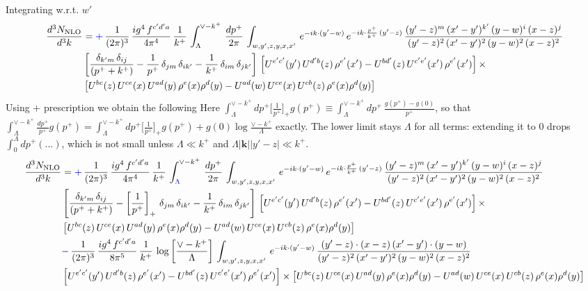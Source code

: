 \documentclass[9pt]{article}
\numberwithin{equation}{section}
\begin{document}
Integrating w.r.t. $w'$
\begin{align}
     \frac{d^{3}N_{\rm NLO}}{d^{3}k} & = {\color{blue}+}\,\frac{1}{(2\pi)^{3}}\, \frac{ig^{4}\,f^{c'd'a}}{4\pi^{4}}\, \frac{1}{k^{+}}\,\int_{\Lambda}^{\vee-k^{+}}\, \frac{dp^{+}}{2\pi}\, \int_{w,y',z,y,x,x'}\, e^{-ik\cdot (y'-w)}\, e^{-ik\cdot \frac{p^{+}}{k^{+}}\,(y'-z)}\,\frac{(y'-z)^{m}\,(x'-y')^{k'}\,(y-w)^{i}\,(x-z)^{j}}{(y'-z)^{2}\,(x'-y')^{2}\,(y-w)^{2}\,(x-z)^{2}}\notag \\ & \left[\frac{\delta_{k'm}\,\delta_{ij}}{(p^{+}+k^{+})}-\frac{1}{p^{+}}\,\delta_{jm}\,\delta_{ik'}-\frac{1}{k^{+}}\, \delta_{im}\, \delta_{jk'}\right]\, \left[U^{e'c'}(y')\,U^{d'b}(z)\,\rho^{e'}(x')-U^{bd'}(z)\,U^{c'e'}(x')\,\rho^{e'}(x')\right]\times\notag \\ &  \left[U^{bc}(z)\,U^{ce}(x)\,U^{ad}(y)\,\rho^{e}(x)\rho^{d}(y)-U^{ad}(w)\,U^{ce}(x)\,U^{cb}(z)\,\rho^{e}(x)\rho^{d}(y)\right]
\end{align}
Using $+$ prescription we obtain the following {\color{blue}Here $\int_{\Lambda}^{\vee-k^{+}}dp^{+}\big[\frac{1}{p^{+}}\big]_{+}g(p^{+})\equiv\int_{\Lambda}^{\vee-k^{+}}dp^{+}\,\frac{g(p^{+})-g(0)}{p^{+}}$, so that $\int_{\Lambda}^{\vee-k^{+}}\frac{dp^{+}}{p^{+}}g(p^{+})=\int_{\Lambda}^{\vee-k^{+}}dp^{+}\big[\frac{1}{p^{+}}\big]_{+}g(p^{+})+g(0)\log\frac{\vee-k^{+}}{\Lambda}$ exactly. The lower limit stays $\Lambda$ for all terms: extending it to $0$ drops $\int_0^\Lambda dp^+(\dots)$, which is not small unless $\Lambda\ll k^+$ and $\Lambda|\mathbf k||y'-z|\ll k^+$.}
\begin{align}
    \frac{d^{3}N_{\rm NLO}}{d^{3}k} & = {\color{blue}+}\,\frac{1}{(2\pi)^{3}}\, \frac{ig^{4}\,f^{c'd'a}}{4\pi^{4}}\, \frac{1}{k^{+}}\,\int_{{\color{blue}\Lambda}}^{\vee-k^{+}}\, \frac{dp^{+}}{2\pi}\, \int_{w,y',z,y,x,x'}\, e^{-ik\cdot (y'-w)}\, e^{-ik\cdot \frac{p^{+}}{k^{+}}\,(y'-z)}\,\frac{(y'-z)^{m}\,(x'-y')^{k'}\,(y-w)^{i}\,(x-z)^{j}}{(y'-z)^{2}\,(x'-y')^{2}\,(y-w)^{2}\,(x-z)^{2}}\notag \\ & \left[\frac{\delta_{k'm}\,\delta_{ij}}{(p^{+}+k^{+})}-\left[\frac{1}{p^{+}}\right]_{+}\,\delta_{jm}\,\delta_{ik'}-\frac{1}{k^{+}}\, \delta_{im}\, \delta_{jk'}\right]\, \left[U^{e'c'}(y')\,U^{d'b}(z)\,\rho^{e'}(x')-U^{bd'}(z)\,U^{c'e'}(x')\,\rho^{e'}(x')\right]\times\notag \\ &  \left[U^{bc}(z)\,U^{ce}(x)\,U^{ad}(y)\,\rho^{e}(x)\rho^{d}(y)-U^{ad}(w)\,U^{ce}(x)\,U^{cb}(z)\,\rho^{e}(x)\rho^{d}(y)\right]\notag \\ & {\color{blue}-}\,\frac{1}{(2\pi)^{3}}\, \frac{ig^{4}\,f^{c'd'a}}{8\pi^{5}}\, \frac{1}{k^{+}}\,\log{\left[\frac{\vee - k^{+}}{\Lambda}\right]}\, \int_{w,y',z,y,x,x'}\, e^{-ik\cdot (y'-w)}\,\frac{(y'-z)\cdot (x-z)\,(x'-y')\cdot (y-w)}{(y'-z)^{2}\,(x'-y')^{2}\,(y-w)^{2}\,(x-z)^{2}}\notag \\ & \left[U^{e'c'}(y')\,U^{d'b}(z)\,\rho^{e'}(x')-U^{bd'}(z)\,U^{c'e'}(x')\,\rho^{e'}(x')\right]\times  \left[U^{bc}(z)\,U^{ce}(x)\,U^{ad}(y)\,\rho^{e}(x)\rho^{d}(y)-U^{ad}(w)\,U^{ce}(x)\,U^{cb}(z)\,\rho^{e}(x)\rho^{d}(y)\right]
\end{align}
\end{document}
